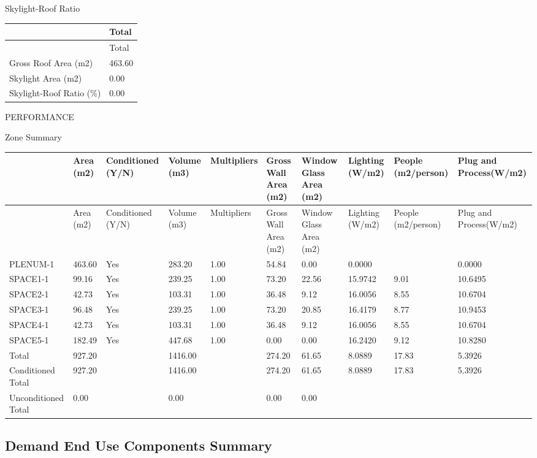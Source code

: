 Skylight-Roof Ratio

\begin{longtable}[c]{@{}ll@{}}
\toprule 
~ & Total \tabularnewline
\midrule
\endfirsthead

\toprule 
~ & Total \tabularnewline
\midrule
\endhead

Gross Roof Area (m2) & 463.60 \tabularnewline
Skylight Area (m2) & 0.00 \tabularnewline
Skylight-Roof Ratio (\%) & 0.00 \tabularnewline
\bottomrule
\end{longtable}

PERFORMANCE

Zone Summary

{\scriptsize
\begin{longtable}[c]{>{\raggedright}p{0.6in}>{\raggedright}p{0.6in}>{\raggedright}p{0.6in}>{\raggedright}p{0.6in}>{\raggedright}p{0.6in}>{\raggedright}p{0.6in}>{\raggedright}p{0.6in}>{\raggedright}p{0.6in}>{\raggedright}p{0.6in}>{\raggedright}p{0.6in}}
\toprule 
~ & Area (m2) & Conditioned (Y/N) & Volume (m3) & Multipliers & Gross Wall Area (m2) & Window Glass Area (m2) & Lighting (W/m2) & People (m2/person) & Plug and Process(W/m2) \tabularnewline
\midrule
\endfirsthead

\toprule 
~ & Area (m2) & Conditioned (Y/N) & Volume (m3) & Multipliers & Gross Wall Area (m2) & Window Glass Area (m2) & Lighting (W/m2) & People (m2/person) & Plug and Process(W/m2) \tabularnewline
\midrule
\endhead

PLENUM-1 & 463.60 & Yes & 283.20 & 1.00 & 54.84 & 0.00 & 0.0000 & ~ & 0.0000 \tabularnewline
SPACE1-1 & 99.16 & Yes & 239.25 & 1.00 & 73.20 & 22.56 & 15.9742 & 9.01 & 10.6495 \tabularnewline
SPACE2-1 & 42.73 & Yes & 103.31 & 1.00 & 36.48 & 9.12 & 16.0056 & 8.55 & 10.6704 \tabularnewline
SPACE3-1 & 96.48 & Yes & 239.25 & 1.00 & 73.20 & 20.85 & 16.4179 & 8.77 & 10.9453 \tabularnewline
SPACE4-1 & 42.73 & Yes & 103.31 & 1.00 & 36.48 & 9.12 & 16.0056 & 8.55 & 10.6704 \tabularnewline
SPACE5-1 & 182.49 & Yes & 447.68 & 1.00 & 0.00 & 0.00 & 16.2420 & 9.12 & 10.8280 \tabularnewline
Total & 927.20 & ~ & 1416.00 & ~ & 274.20 & 61.65 & 8.0889 & 17.83 & 5.3926 \tabularnewline
Conditioned Total & 927.20 & ~ & 1416.00 & ~ & 274.20 & 61.65 & 8.0889 & 17.83 & 5.3926 \tabularnewline
Unconditioned Total & 0.00 & ~ & 0.00 & ~ & 0.00 & 0.00 & ~ & ~ & ~ \tabularnewline
\bottomrule
\end{longtable}}

\subsection{Demand End Use Components Summary}\label{demand-end-use-components-summary}


